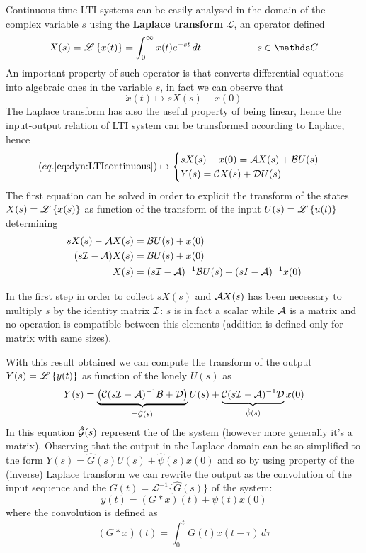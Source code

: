 	Continuous-time LTI systems can be easily analysed in the domain of the complex variable $s$ using the \textbf{Laplace transform} $\mathscr L$, an operator defined
	\[ X(s) = \laplace{x(t)} = \int_0^\infty x(t) e^{-st}\, dt \hspace{2cm} s \in \mathds C \]
	An important property of such operator is that converts differential equations into algebraic ones in the variable $s$, in fact we can observe that
	\[ \dot x(t) \mapsto s X(s) - x(0) \]
	The Laplace transform has also the useful property of being linear, hence the input-output relation of LTI system can be transformed according to Laplace, hence
	\begin{equation}
		(eq.\ref{eq:dyn:LTIcontinuous}) \mapsto \begin{cases}
			sX(s) - x(0) = \mathcal{A} X(s) + \mathcal{B} U(s) \\ Y(s) = \mathcal{C} X(s) + \mathcal{D} U(s)
		\end{cases}
	\end{equation}
	The first equation can be solved in order to explicit the transform of the states $X(s) = \mathscr{L} \left\{ x(s) \right\}$ as function of the transform of the input $U(s) = \mathscr{L} \left\{ u(t) \right\}$ determining
	\begin{align*}
		sX(s) - \mathcal{A} X(s) & = \mathcal{B} U(s) + x(0) \\
		(s\mathcal{I}-\mathcal{A}) X(s) & = \mathcal{B} U(s) + x(0) \\
		X(s) & = (s\mathcal{I} - \mathcal{A})^{-1} \mathcal{B} U(s) + (sI- \mathcal{A})^{-1} x(0) 
	\end{align*}
	\begin{note}
		In the first step in order to collect $sX(s)$ and $\mathcal{A} X(s)$ has been necessary to multiply $s$ by the identity matrix $\mathcal{I}$: $s$ is in fact a scalar while $\mathcal{A}$ is a matrix and no operation is compatible between this elements (addition is defined only for matrix with same sizes).
	\end{note} \noindent
	With this result obtained we can compute the transform of the output $Y(s) = \mathscr{L} \left\{ y(t) \right\}$ as function of the lonely $U(s)$ as 
	\begin{equation}
		Y(s) = \underbrace{\left(\mathcal{C} (s\mathcal{I} - \mathcal{A})^{-1} \mathcal{B} + \mathcal{D}\right)}_{= \hat {\mathcal{G}}(s)} U(s) + \underbrace{\mathcal{C}(s\mathcal{I}-\mathcal{A})^{-1} \mathcal{D}}_{\hat \psi(s)} x(0)
	\end{equation}
	In this equation $\hat {\mathcal{G}}(s)$ represent the  of the system (however more generally it's a matrix). Observing that the output in the Laplace domain can be so simplified to the form $Y(s) = \hat G(s) U(s) + \hat \psi(s) x(0)$ and so by using property of the (inverse) Laplace transform we can rewrite the output as the convolution of the input sequence and the  $G(t) = \mathscr L^{-1}\{\hat G(s)\}$ of the system:
	\begin{equation}
		y(t) = (G*x)(t) + \psi(t) x(0)
	\end{equation}
	where the convolution is defined as
	\[ (G*x)(t) = \int_0^t G(t)x(t-\tau)\, d\tau \]
	

